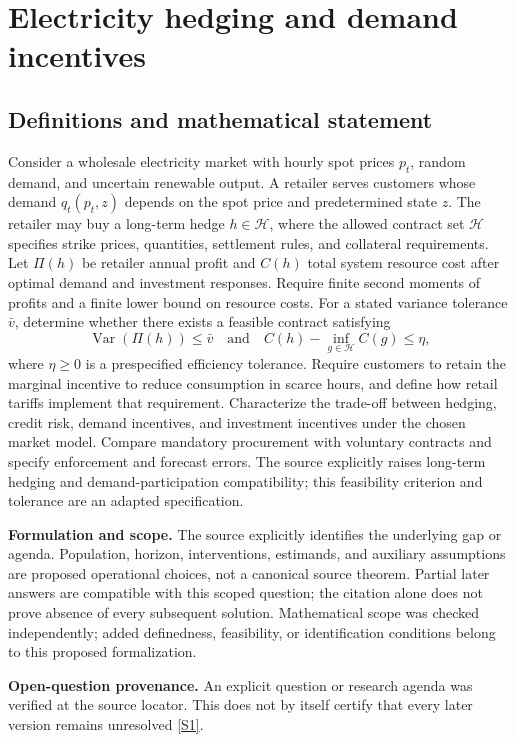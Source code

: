 \documentclass[11pt]{article}
\newcommand{\sref}[2]{\hyperlink{source:#1:#2}{[S#2]}}
\begin{document}
\section*{Electricity hedging and demand incentives}\label{30007720}
\subsection{Definitions and mathematical statement}
Consider a wholesale electricity market with hourly spot prices \(p_t\), random demand, and uncertain renewable output. A retailer serves customers whose demand \(q_t(p_t,z)\) depends on the spot price and predetermined state \(z\). The retailer may buy a long-term hedge \(h\in\mathcal H\), where the allowed contract set \(\mathcal H\) specifies strike prices, quantities, settlement rules, and collateral requirements. Let \(\Pi(h)\) be retailer annual profit and \(C(h)\) total system resource cost after optimal demand and investment responses. Require finite second moments of profits and a finite lower bound on resource costs. For a stated variance tolerance \(\bar v\), determine whether there exists a feasible contract satisfying
\[\operatorname{Var}(\Pi(h))\leq\bar v\quad\text{and}\quad C(h)-\inf_{g\in\mathcal H}C(g)\leq\eta,\]
where \(\eta\geq0\) is a prespecified efficiency tolerance. Require customers to retain the marginal incentive to reduce consumption in scarce hours, and define how retail tariffs implement that requirement. Characterize the trade-off between hedging, credit risk, demand incentives, and investment incentives under the chosen market model. Compare mandatory procurement with voluntary contracts and specify enforcement and forecast errors. The source explicitly raises long-term hedging and demand-participation compatibility; this feasibility criterion and tolerance are an adapted specification.

\par\textbf{Formulation and scope.} The source explicitly identifies the underlying gap or agenda. Population, horizon, interventions, estimands, and auxiliary assumptions are proposed operational choices, not a canonical source theorem. Partial later answers are compatible with this scoped question; the citation alone does not prove absence of every subsequent solution. Mathematical scope was checked independently; added definedness, feasibility, or identification conditions belong to this proposed formalization.

\par\textbf{Open-question provenance.} An explicit question or research agenda was verified at the source locator. This does not by itself certify that every later version remains unresolved \sref{30007720}{1}.
\end{document}
